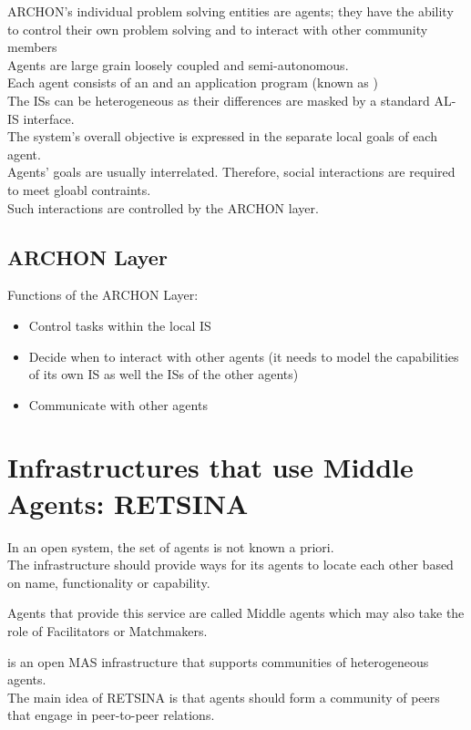 ARCHON's individual problem solving entities are agents; they have the ability to control their own problem solving and to interact with other community members\\
Agents are large grain loosely coupled and semi-autonomous.\\
Each agent consists of an  and an application program (known as )\\
The ISs can be heterogeneous as their differences are masked by a standard AL-IS interface.\\
The system's overall objective is expressed in the separate local goals of each agent.\\
Agents' goals are usually interrelated. Therefore, social interactions are required to meet gloabl contraints.\\
Such interactions are controlled by the ARCHON layer.
\subsection{ARCHON Layer}
Functions of the ARCHON Layer:
\begin{itemize}
\item Control tasks within the local IS
\item Decide when to interact with other agents (it needs to model the capabilities of its own IS as well the ISs of the other agents)
\item Communicate with other agents
\end{itemize}

\section{Infrastructures that use Middle Agents: RETSINA}
In an open system, the set of agents is not known a priori.\\
The infrastructure should provide ways for its agents to locate each other based on name, functionality or capability.

Agents that provide this service are called Middle agents which may also take the role of Facilitators or Matchmakers.

 is an open MAS infrastructure that supports communities of heterogeneous agents.\\
The main idea of RETSINA is that agents should form a community of peers that engage in peer-to-peer relations.

